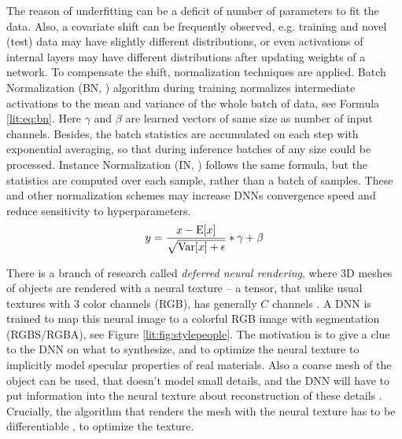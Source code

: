 The reason of underfitting can be a deficit of number of parameters to fit the data. Also, a covariate shift can be frequently observed, e.g. training and novel (test) data may have slightly different distributions, or even activations of internal layers may have different distributions after updating weights of a network. To compensate the shift, normalization techniques are applied. Batch Normalization (BN, \cite{dnn:bn15}) algorithm during training normalizes intermediate activations to the mean and variance of the whole batch of data, see Formula \ref{lit:eq:bn}. Here $\gamma$ and $\beta$ are learned vectors of same size as number of input channels. Besides, the batch statistics are accumulated on each step with exponential averaging, so that during inference batches of any size could be processed. Instance Normalization (IN, \cite{dnn:in16}) follows the same formula, but the statistics are computed over each sample, rather than a batch of samples. These and other normalization schemes may increase DNNs convergence speed and reduce sensitivity to hyperparameters.
\begin{equation}
	\setlength\abovedisplayskip{2pt}y = \frac{x - \mathrm{E}[x]}{\sqrt{\mathrm{Var}[x] + \epsilon}} * \gamma + \beta
	\setlength\belowdisplayskip{2pt}
	\label{lit:eq:bn}
\end{equation}

There is a branch of research called \textit{deferred neural rendering}, where 3D meshes of objects are rendered with a neural texture -- a tensor, that unlike usual textures with 3 color channels (RGB), has generally $C$ channels \cite{dnn:deferred19}. A DNN is trained to map this neural image to a colorful RGB image with segmentation (RGBS/RGBA), see Figure \ref{lit:fig:stylepeople}. The motivation is to give a clue to the DNN on what to synthesize, and to optimize the neural texture to implicitly model specular properties of real materials. Also a coarse mesh of the object can be used, that doesn't model small details, and the DNN will have to put information into the neural texture about reconstruction of these details \cite{dnn:stylepeople21, dnn:anr21}. Crucially, the algorithm that renders the mesh with the neural texture has to be differentiable \cite{survey:diff-render20}, to optimize the texture.

